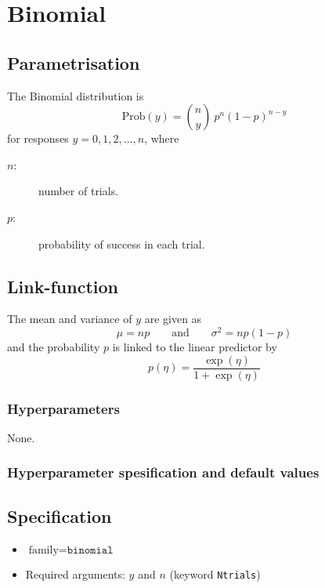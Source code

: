 \documentclass[a4paper,11pt]{article}
\begin{document}
\section*{Binomial}

\subsection*{Parametrisation}

The Binomial distribution is
\begin{displaymath}
    \text{Prob}(y) = {n \choose y} \ p^n (1-p)^{n-y}
\end{displaymath}
for responses $y=0, 1, 2, \ldots,n$, where
\begin{description}
\item[$n$:] number of trials.
\item[$p$:] probability of success in each trial.
\end{description}

\subsection*{Link-function}

The mean and variance of $y$ are given as
\begin{displaymath}
    \mu = np \qquad\text{and}\qquad \sigma^{2} = np(1-p)
\end{displaymath}
and the probability $p$ is linked to the linear predictor by
\begin{displaymath}
    p(\eta) = \frac{\exp(\eta)}{1+\exp(\eta)}
\end{displaymath}

\subsubsection*{Hyperparameters}
None.

\subsubsection*{Hyperparameter spesification and default values}


\subsection*{Specification}

\begin{itemize}
\item $\text{family}=\texttt{binomial}$
\item Required arguments: $y$ and $n$ (keyword \texttt{Ntrials})
\end{itemize}
\end{document}
